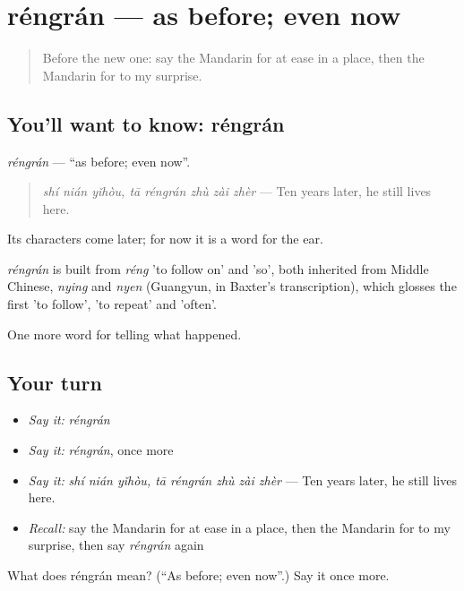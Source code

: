\section[réngrán]{réngrán — as before; even now}

\label{lesson:ZH-C315-rengran}



\begin{quote}
Before the new one: say the Mandarin for at ease in a place, then the Mandarin for to my surprise.
\end{quote}

\subsection*{You'll want to know: réngrán}
\emph{réngrán} — \textquotedblleft{}as before; even now\textquotedblright{}.

\begin{quote}
\emph{shí nián yǐhòu, tā réngrán zhù zài zhèr} — Ten years later, he still lives here.
\end{quote}

Its characters come later; for now it is a word for the ear.

\begin{cousinweb}
\emph{réngrán} is built from \emph{réng} 'to follow on' and  'so', both inherited from Middle Chinese, \emph{nying} and \emph{nyen} (Guangyun, in Baxter's transcription), which glosses the first 'to follow', 'to repeat' and 'often'.
\end{cousinweb}

\begin{grammarlens}[title={What you've built}]
One more word for telling what happened.
\end{grammarlens}

\subsection*{Your turn}
\begin{itemize}
\raggedright
  \item \emph{Say it:} \emph{réngrán}
  \item \emph{Say it:} \emph{réngrán}, once more
  \item \emph{Say it:} \emph{shí nián yǐhòu, tā réngrán zhù zài zhèr} — Ten years later, he still lives here.
  \item \emph{Recall:} say the Mandarin for at ease in a place, then the Mandarin for to my surprise, then say \emph{réngrán} again
\end{itemize}

\begin{tcolorbox}[breakable,colback=teal!4,colframe=teal!35!black,title={Before you move on}]
What does réngrán mean? (\textquotedblleft{}As before; even now\textquotedblright{}.) Say it once more.
\end{tcolorbox}
